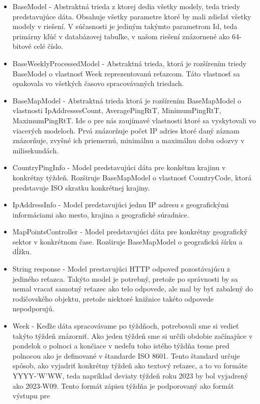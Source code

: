 \begin{itemize}
    \item BaseModel
    - Abstraktná trieda z ktorej dedia všetky modely, teda triedy predstavujúce dáta. Obsahuje všetky parametre ktoré by mali zdieľať všetky modely v riešení. V súčasnosti 
    je jediným takýmto parametrom Id, teda primárny kľúč v databázovej tabuľke, v našom riešení znázornené ako 64-bitové celé číslo.
    \item BaseWeeklyProcessedModel
    - Abstraktná trieda, ktorá je rozšírením triedy BaseModel o vlastnosť Week reprezentovanú reťazcom. Táto vlastnosť 
    sa opakovala vo všetkých časovo spracovávaných triedach.
    \item BaseMapModel 
    - Abstraktná trieda ktorá je rozšírením BaseMapModel o vlastnosti IpAddressesCount, AveragePingRtT, MinimumPingRtT, MaximumPingRtT. 
    Ide o pre nás zaujímavé vlastnosti ktoré sa vyskytovali vo 
    viacerých modeloch. Prvá znázorňuje počet IP adries ktoré daný záznam znázorňuje, zvyšné ich priemernú, minimálnu a maximálnu dobu odozvy v milisekundách.
    \item CountryPingInfo
    - Model predstavujúci dáta pre konkétnu krajinu v konkrétny týždeň. Rozširuje BaseMapModel o vlastnosť CountryCode, ktorá predstavuje ISO skratku konkrétnej
    krajiny.
    \item IpAddressInfo
    - Model predstavujúci jednu IP adresu s geografickými informáciami ako mesto, krajina a geografické súradnice.
    \item MapPointsController
    - Model predstavujúci dáta pre konkrétny geografický sektor v konkrétnom čase. Rozširuje BaseMapModel o geografickú šírku a dĺžku.
    \item String response
    - Model prestavujúci HTTP odpoveď pozostávajúcu z jediného reťazca. Takýto model je potrebný, pretože po správnosti by sa nemal vracať 
    samotný reťazec ako telo odpovede, ale mal by byť zabalený do rodičovského objektu, pretože niektoré knižnice takéto odpovede nepodporujú.
    \item Week
    - Keďže dáta spracovávame po týždňoch, potrebovali sme si vedieť takýto týždeň znázorniť. Ako jeden týždeň sme si určili obdobie začínajúce v pondelok o polnoci a končiace 
    v nedeľu toho istého týždňa tesne pred polnocou ako je definované v štandarde ISO 8601. Tento štandard určuje spôsob, ako vyjadriť konkrétny týždeň ako textový reťazec, 
    a to vo formáte YYYY-'W'WW, teda napríklad deviaty týždeň roku 2023 by bol vyjadrený ako 2023-W09. Tento formát zápisu týždňa je podporovaný ako formát výstupu pre 

\end{itemize}
